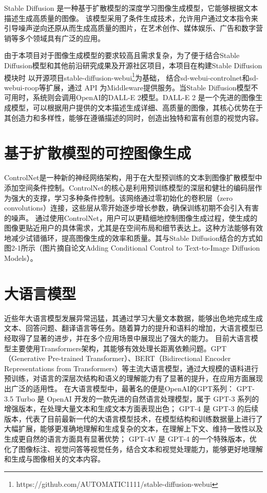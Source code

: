 \documentclass[a4paper,AutoFakeBold,oneside,12pt]{book}
\begin{document}
Stable Diffusion\cite{rombach2022high} 是一种基于扩散模型的深度学习图像生成模型，它能够根据文本描述生成高质量的图像。
该模型采用了条件生成技术，允许用户通过文本指令来引导噪声逆向还原从而生成高质量的图片，在艺术创作、媒体娱乐、广告和数字营销等多个领域具有广泛的应用。


由于本项目对于图像生成模型的要求较高且需求复杂，为了便于结合Stable Diffusion模型和其他前沿研究成果及开源社区项目，本项目在构建Stable Diffusion模块时
以开源项目stable-diffusion-webui\footnote{https://github.com/AUTOMATIC1111/stable-diffusion-webui}为基础，
结合sd-webui-controlnet和sd-webui-roop等扩展，通过 API 为Middleware提供服务。当Stable Diffusion模型不可用时，系统则会调用OpenAI的DALL-E 2模型。DALL-E 2 是一个先进的图像生成模型，可以根据用户提供的文本描述生成详细、高质量的图像，其核心优势在于其创造力和多样性，能够在遵循描述的同时，创造出独特和富有创意的视觉内容。

\section{基于扩散模型的可控图像生成}
ControlNet\cite{zhang2023adding}是一种新的神经网络架构，用于在大型预训练的文本到图像扩散模型中添加空间条件控制。ControlNet的核心是利用预训练模型的深层和健壮的编码层作为强大的支撑，学习多种条件控制。该网络通过零初始化的卷积层（zero convolutions）连接，这些层从零开始逐步增长参数，确保训练初期不会引入有害的噪声。
通过使用ControlNet，用户可以更精细地控制图像生成过程，使生成的图像更贴近用户的具体需求，尤其是在空间布局和细节表达上。这种方法能够有效地减少试错循环，提高图像生成的效率和质量。其与Stable Diffusion结合的方式如图2-1所示（图片摘自论文Adding Conditional Control to Text-to-Image Diffusion Models\cite{zhang2023adding}）。




\section{大语言模型}
近些年大语言模型发展异常迅猛，其通过学习大量文本数据，能够出色地完成生成文本、回答问题、翻译语言等任务。随着算力的提升和语料的增加，大语言模型已经取得了显著的进步，并在多个应用场景中展现出了强大的能力。
目前大语言模型主要使用Transformers\cite{vaswani2017attention}架构，其能够有效处理长距离依赖问题。GPT（Generative Pre-trained Transformer）、BERT（Bidirectional Encoder Representations from Transformers）等主流大语言模型，通过大规模的语料进行预训练，对语言的深层次结构和语义的理解能力有了显著的提升，在应用方面展现出广泛的适用性。
在大语言模型中，最著名的便是OpenAI的GPT系列：
GPT-3.5 Turbo 是 OpenAI 开发的一款先进的自然语言处理模型，属于 GPT-3 系列的增强版本，在处理大量文本和生成文本方面表现出色；
GPT-4\cite{achiam2023gpt} 是 GPT-3 的后续版本，代表了目前最新一代的大语言模型技术，在模型结构和训练数据量上进行了大幅扩展，能够更准确地理解和生成复杂的文本，在理解上下文、维持一致性以及生成更自然的语言方面具有显著优势；
GPT-4V 是 GPT-4 的一个特殊版本，优化了图像标注、视觉问答等视觉任务，结合文本和视觉处理能力，能够更好地理解和生成与图像相关的文本内容。
\end{document}
